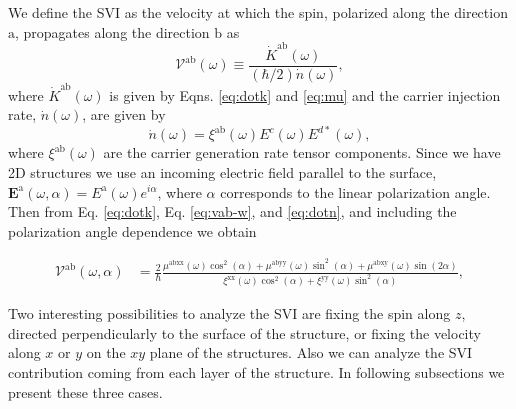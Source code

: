 \documentclass[prb,11pt,tightenlines,twocolumn,aps]{revtex4-1}
\begin{document}
We define the SVI as the velocity at which the spin, polarized along the
direction $\mathrm{a}$, propagates along the direction $\mathrm{b}$ as
\begin{equation}\label{eq:vab-w}
\mathcal{V}^{\mathrm{ab}}(\omega) \equiv
\frac{\dot{K}^{\mathrm{ab}}(\omega)}{(\hbar/2) \dot{n}(\omega)},
\end{equation}  
where $\dot{K}^{\mathrm{ab}} (\omega)$ is given by Eqns. \eqref{eq:dotk} and
\eqref{eq:mu} and the carrier
injection rate,
$\dot{n}(\omega)$, are given by
% 
\begin{equation}
\dot{n}(\omega) =
\xi^{\mathrm{ab}}(\omega) E^{c }(\omega) E^{d*}(\omega),
\label{eq:dotn}
\end{equation}
where $\xi^{\mathrm{ab}}(\omega)$ are the carrier
generation rate tensor components. 
% 
Since we have 2D structures we use an incoming electric field parallel to the
surface, $\mathbf{E}^{\mathrm{a}}(\omega,\alpha) = E^{\mathrm{a}}(\omega)
e^{i\alpha}$, where $\alpha$ corresponds to the linear polarization angle.
% 
Then from Eq. \eqref{eq:dotk}, Eq. \eqref{eq:vab-w}, and \eqref{eq:dotn}, and
including the polarization angle dependence we obtain
\begin{widetext}
\begin{align}
\mathcal{V}^{\mathrm{ab}}(\omega,\alpha)
&= 
\frac{2}{\hbar}
\frac{\mu^{\mathrm{abxx}}(\omega)\cos^{2}(\alpha) + 
\mu^{\mathrm{abyy}}(\omega)\sin^{2}(\alpha) + 
\mu^{\mathrm{abxy}}(\omega)\sin(2\alpha)}
{\xi^{\mathrm{xx}}(\omega)\cos^{2}(\alpha) + 
\xi^{\mathrm{yy}}(\omega)\sin^{2}(\alpha)},
\label{eq:vab-aw}
\end{align}
\end{widetext}
% 
Two interesting possibilities to analyze the SVI are fixing the spin along $z$,
directed perpendicularly to the surface of the structure, or fixing the
velocity along $x$ or $y$ on the $xy$ plane of the structures. Also we can
analyze the SVI contribution coming from each layer of the structure. In
following subsections we present these three cases.

\end{document}
